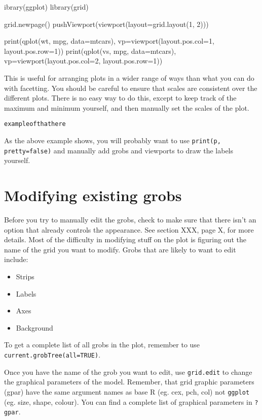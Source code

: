 ibrary(ggplot)
library(grid)

grid.newpage()
pushViewport(viewport(layout=grid.layout(1, 2)))

print(qplot(wt, mpg, data=mtcars), vp=viewport(layout.pos.col=1, layout.pos.row=1))
print(qplot(vs, mpg, data=mtcars), vp=viewport(layout.pos.col=2, layout.pos.row=1))


This is useful for arranging plots in a wider range of ways than what you can do with facetting.   You should be careful to ensure that scales are consistent over the different plots.  There is no easy way to do this, except to keep track of the maximum and minimum yourself, and then manually set the scales of the plot.

\begin{alltt}
	example of that here
\end{alltt}

As the above example shows, you will probably want to use {\tt print(p, pretty=false)} and manually add grobs and viewports to draw the labels yourself.
 
\section{Modifying existing grobs}\label{sec:modifying_stuff}

Before you try to manually edit the grobs, check to make sure that there isn't an option that already controls the appearance.  See section XXX, page X, for more details.  Most of the difficulty in modifying stuff on the plot is figuring out the name of the grid you want to modify.  Grobs that are likely to want to edit include:

\begin{itemize}
	\item Strips
	\item Labels
	\item Axes
	\item Background
\end{itemize}

To get a complete list of all grobs in the plot, remember to use {\tt current.grobTree(all=TRUE)}.  

Once you have the name of the grob you want to edit, use  {\tt grid.edit} to change the graphical parameters of the model.  Remember, that grid graphic parameters (gpar) have the same argument names as base R (eg. cex, pch, col) not {\tt ggplot} (eg. size, shape, colour).  You can find a complete list of graphical parameters in {\tt ?gpar}.


